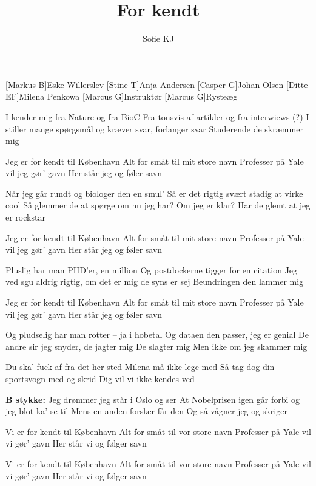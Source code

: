 \documentclass[a4paper,11pt]{article}
\title{For kendt}
\author{Sofie KJ}
\begin{document}
\maketitle

\begin{roles}
[Markus B]Eske Willerslev
[Stine T]Anja Andersen
[Casper G]Johan Olsen
[Ditte EF]Milena Penkowa
[Marcus G]Instruktør
[Marcus G]Rysteæg
\end{roles}

\begin{song}
I kender mig fra Nature og fra BioC
Fra tonsvis af artikler og fra interwiews (?)
I stiller mange spørgsmål og kræver svar, forlanger svar
Studerende de skræmmer mig

Jeg er for kendt til København
Alt for småt til mit store navn
Professer på Yale vil jeg gør' gavn
Her står jeg og føler savn

Når jeg går rundt og biologer den en smul'
Så er det rigtig svært stadig at virke cool
Så glemmer de at spørge om nu jeg har?
Om jeg er klar?
Har de glemt at jeg er rockstar

Jeg er for kendt til København
Alt for småt til mit store navn
Professer på Yale vil jeg gør' gavn
Her står jeg og føler savn

Pluslig har man PHD'er, en million
Og postdockerne tigger for en citation
Jeg ved sgu aldrig rigtig, om det er mig
de syns er sej
Beundringen den lammer mig

Jeg er for kendt til København
Alt for småt til mit store navn
Professer på Yale vil jeg gør' gavn
Her står jeg og føler savn

Og pludselig har man rotter – ja i hobetal
Og dataen den passer, jeg er genial
De andre sir jeg snyder, de jagter mig
De slagter mig
Men ikke om jeg skammer mig

Du ska' fuck af fra det her sted
Milena må ikke lege med
Så tag dog din sportsvogn med og skrid
Dig vil vi ikke kendes ved

\textbf{B stykke:}
Jeg drømmer jeg står i Oslo og ser
At Nobelprisen igen går forbi 
og jeg blot ka' se til
Mens en anden forsker får den
Og så vågner jeg og skriger

Vi er for kendt til København
Alt for småt til vor store navn
Professer på Yale vil vi gør' gavn
Her står vi og følger savn

Vi er for kendt til København
Alt for småt til vor store navn
Professer på Yale vil vi gør' gavn
Her står vi og følger savn

\end{song}
\end{document}
